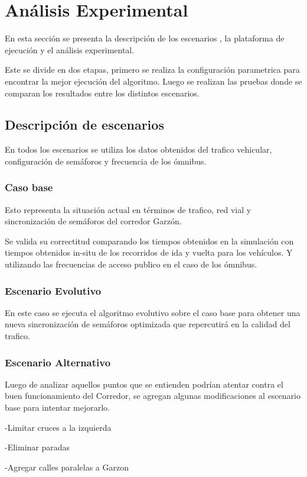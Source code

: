 \chapter{Análisis Experimental}
En esta sección se presenta la descripción de los escenarios , la plataforma de ejecución y el análisis experimental.

Este se divide en dos etapas, primero se realiza la configuración parametrica para encontrar la mejor ejecución del algoritmo. Luego se realizan las pruebas donde se comparan los resultados entre los distintos escenarios.


\section{Descripción de escenarios}
En todos los escenarios se utiliza los datos obtenidos del trafico vehicular, configuración de semáforos y frecuencia de los ómnibus. 

\subsection{Caso base}
Esto representa la situación actual en términos de trafico, red vial y sincronización de semáforos del corredor Garzón. 

Se valida su correctitud comparando los tiempos obtenidos en la simulación con tiempos obtenidos in-situ de los recorridos de ida y vuelta para los vehículos. Y utilizando las frecuencias de acceso publico en el caso de los ómnibus.

\subsection{Escenario Evolutivo }
En este caso se ejecuta el algoritmo evolutivo sobre el caso base para obtener una nueva sincronización de semáforos optimizada que repercutirá en la calidad del trafico.

\subsection{Escenario Alternativo}
Luego de analizar aquellos puntos que se entienden podrían atentar contra el buen funcionamiento del Corredor, se agregan algunas modificaciones al escenario base para intentar mejorarlo. 

-Limitar cruces a la izquierda

-Eliminar paradas

-Agregar calles paralelas a Garzon

